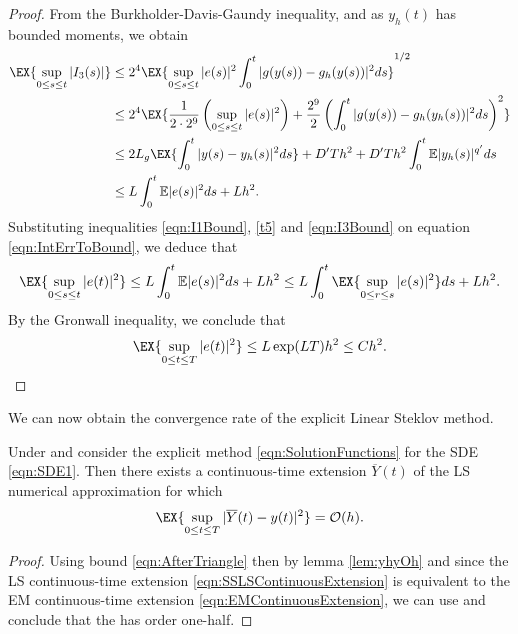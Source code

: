 \begin{proof}
	From the Burkholder-Davis-Gaundy inequality,  and 
	as $y_h(t)$ has bounded moments, we obtain
	\begin{align}
		\EX{ 
			\sup_{0\leq s \leq t}
			|I_3(s)|
		}
		&\leq
		2^4 
		\EX{
			\sup_{0 \leq s \leq t}
			|e(s)|^2
			\int_{0}^t
				|g(y(s))-g_h(y(s))|^2 ds
		}^{1/2} \notag \\
		&\leq
		2^4 
		\EX{
			\frac{1}{2 \cdot 2^9}
			\left(
				\sup_{0\leq s \leq t}
				|e(s)|^2
			\right)			
			+
			\frac{2^9}{2}
			\left(
				\int_{0}^t
					|g(y(s)) - g_h(y_h(s))|^2 ds
			\right)^2
		}
		\notag \\
		&\leq
			2 L_g
			\EX{
				\int_{0}^t
					|y(s) - y_h(s)|^2 ds		
				} 
			+D'Th^2 
			+
			D'Th^2
			\int_{0}^t
				\m{|y_h(s)|^{q'}} ds 	
		\notag \\
		&\leq
			L
			\int_{0}^t
				\m |e(s)|^2 ds
			+L h^2. \label{eqn:I3Bound}
	\end{align}
	Substituting inequalities \eqref{eqn:I1Bound}, \eqref{t5} and \eqref{eqn:I3Bound} 
	on equation \eqref{eqn:IntErrToBound}, we deduce that
	\begin{equation*}
		\EX{
			\sup_{0\leq s \leq t}	
			|e(t)|^2
		}
		\leq
			L \int_0^t
				\m |e(s)|^2 ds
			+
			L h^2 
		\leq		
			L \int_{0}^t
				\EX{
					\sup_{0\leq r \leq s}
					|e(s)|^2	
				}ds
			+Lh^2.		
	\end{equation*}
	By the Gronwall inequality, we conclude that
	\begin{equation*}
		\EX{
			\sup_{0 \leq t \leq T} 	
			|e(t)|^2
		}
		\leq
			L  \exp(LT) h^2 \leq C h^2. 
	\end{equation*} 
		
\end{proof}

	We  can now obtain the convergence rate of the explicit Linear Steklov method.

\begin{thm}
	Under  and consider the explicit \SM method 
	\eqref{eqn:SolutionFunctions} for the SDE \eqref{eqn:SDE1}.
	Then there exists a continuous-time extension $\overline{Y}(t)$ of the 
	LS numerical approximation for which
	\begin{equation} \label{orden}
		\EX{
			\sup_{0 \leq t \leq T}
			|\overline{Y}(t) - y(t)|^2	
		} = \mathcal{O}(h).	
	\end{equation}
\end{thm}
\begin{proof} Using bound  \eqref{eqn:AfterTriangle} then by  lemma \ref{lem:yhyOh} and since
 the LS continuous-time extension \eqref{eqn:SSLSContinuousExtension} is equivalent to the EM continuous-time extension 
 \eqref{eqn:EMContinuousExtension}, 
 we can use  and conclude that the \SM has order one-half. 
\end{proof}
